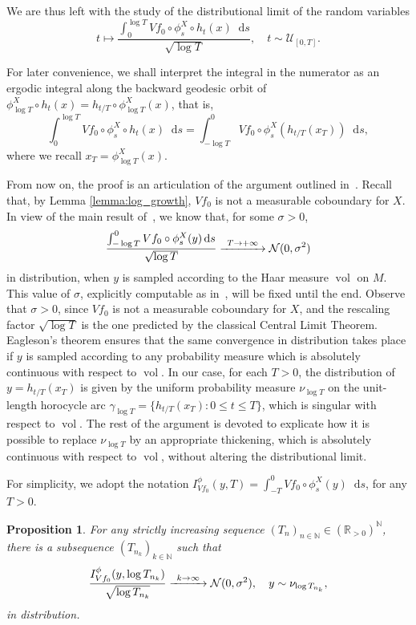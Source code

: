 \documentclass[JEP,XML,SOM,NoEqCountersInSection,Unicode,published]{cedram}
\newcommand\To[1]{\mathchoice{\xrightarrow{\kern4pt#1\kern3pt}}{\stackrel{#1}{\longrightarrow}}{}{}}
\newcommand \R{\mathbb{R}}
\newcommand \N{\mathbb{N}}
\newcommand {\cN}{\mathcal{N}}
\newcommand*{\diff}{\mathop{}\!\mathrm{d}}
\DeclareMathOperator{\vol}{vol}
\newtheorem {proposition}[theorem]{Proposition}
\theoremstyle{definition}
\begin{document}
\begin{appendix}
We are thus left with the study of the distributional limit of the random variables
\begin{equation*}
t\mapsto \frac{\int_0^{\log{T}}Vf_0\circ \phi^{X}_s\circ h_t(x) \diff s}{\sqrt{\log{T}}}, \quad t\sim \mathcal{U}_{[0,T]}.
\end{equation*}

For later convenience, we shall interpret the integral in the numerator as an ergodic integral along the backward geodesic orbit of $\phi_{\log{T}}^{X}\circ h_t(x)=h_{t/T} \circ \phi^{X}_{\log{T}}(x)$, that is,
\begin{equation*}
\int_0^{\log{T}}Vf_0\circ \phi^{X}_s\circ h_t(x) \diff s=\int_{-\log{T}}^{0}Vf_0\circ \phi_s^{X}(h_{t/T}(x_T))\diff s,
\end{equation*}
where we recall $x_T =\phi^{X}_{\log{T}}(x)$.

From now on, the proof is an articulation of the argument outlined in~\cite{Dolgopyat-Sarig}. Recall that, by Lemma \ref{lemma:log_growth}, $Vf_0$ is not a measurable coboundary for $X$. In view of the main result of~\cite{Rat:CLT}, we know that, for some $\sigma >0$,
\begin{equation*}
\frac{\int_{-\log{T}}^{0}Vf_0\circ \phi^{X}_s(y)\diff s}{\sqrt{\log{T}}}\To{T\to+\infty}\cN(0,\sigma^{2})
\end{equation*}
in distribution, when $y$ is sampled according to the Haar measure $\vol$ on $M$. This value of $\sigma$, explicitly computable as in~\cite[Th.\,3.1]{Rat:CLT}, will be fixed until the end.
Observe that $\sigma >0$, since $Vf_0$ is not a measurable coboundary for $X$, and the rescaling factor $\sqrt{\log T}$ is the one predicted by the classical Central Limit Theorem.
Eagleson's theorem \cite{Eagleson} ensures that the same convergence in distribution takes place if $y$ is sampled according to any probability measure which is absolutely continuous with respect to $\vol$. In our case, for each $T>0$, the distribution of $y=h_{t/T}(x_T)$ is given by the uniform probability measure $\nu_{\log{T}}$ on the unit-length horocycle arc $\gamma_{\log{T}}=\{h_{t/T}(x_T):0\leq t\leq T \}$, which is singular with respect to $\vol$. The rest of the argument is devoted to explicate how it is possible to replace $\nu_{\log{T}}$ by an appropriate thickening, which is absolutely continuous with respect to $\vol$, without altering the distributional limit.

For simplicity, we adopt the notation $I_{Vf_0}^{\phi}(y,T)=\int_{-T}^{0}Vf_0\circ \phi^{X}_s(y)\diff s$, for any $T>0$.
\begin{proposition}
\label{thickeningtrick}
For any strictly increasing sequence $(T_n)_{n\in \N}\in (\R_{>0})^{\N}$, there is a subsequence $(T_{n_k})_{k\in \N}$ such that
\begin{equation*}
\frac{I^{\phi}_{Vf_0}(y,\log{T_{n_k}})}{\sqrt{\log{T_{n_k}}}}\To{k\to\infty}\cN(0,\sigma^{2}), \quad y\sim \nu_{\log{T_{n_k}}},
\end{equation*}
in distribution.
\end{proposition}


\end{appendix}
\end{document}
